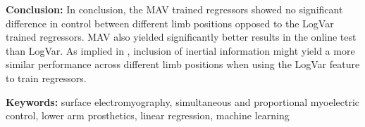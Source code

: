 \textbf{Conclusion:} 
In conclusion, the MAV trained regressors showed no significant difference in control between different limb positions opposed to the LogVar trained regressors. MAV also yielded significantly better results in the online test than LogVar. As implied in \cite{Fougner2010}, inclusion of inertial information might yield a more similar performance across different limb positions when using the LogVar feature to train regressors. 

\textbf{Keywords:} surface electromyography, simultaneous and proportional myoelectric control, lower arm prosthetics, linear regression, machine learning %

